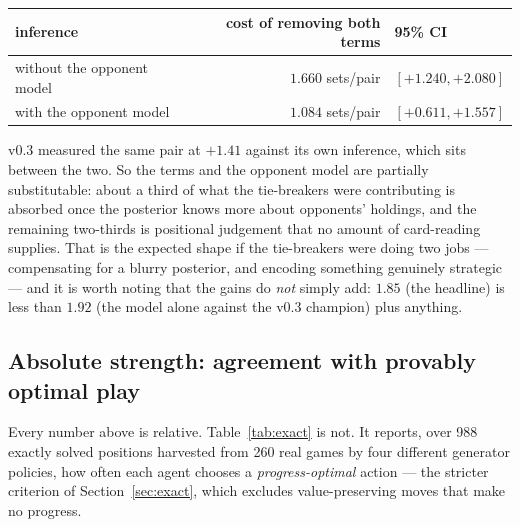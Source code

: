 \documentclass[11pt,a4paper]{article}
\begin{document}
\begin{center}
\small
\begin{tabular}{lrl}
\toprule
inference & cost of removing both terms & 95\% CI \\
\midrule
without the opponent model & $1.660$ sets/pair & $[+1.240, +2.080]$ \\
with the opponent model    & $1.084$ sets/pair & $[+0.611, +1.557]$ \\
\bottomrule
\end{tabular}
\end{center}

v0.3 measured the same pair at $+1.41$ against its own inference, which sits
between the two. So the terms and the opponent model are partially substitutable:
about a third of what the tie-breakers were contributing is absorbed once the
posterior knows more about opponents' holdings, and the remaining two-thirds is
positional judgement that no amount of card-reading supplies. That is the
expected shape if the tie-breakers were doing two jobs --- compensating for a
blurry posterior, and encoding something genuinely strategic --- and it is worth
noting that the gains do \emph{not} simply add: $1.85$ (the headline) is less
than $1.92$ (the model alone against the v0.3 champion) plus anything.

\subsection{Absolute strength: agreement with provably optimal play}
\label{sec:res-absolute}

Every number above is relative. Table~\ref{tab:exact} is not. It reports, over
988 exactly solved positions harvested from 260 real games by four different
generator policies, how often each agent chooses a \emph{progress-optimal}
action --- the stricter criterion of Section~\ref{sec:exact}, which excludes
value-preserving moves that make no progress.
\end{document}
